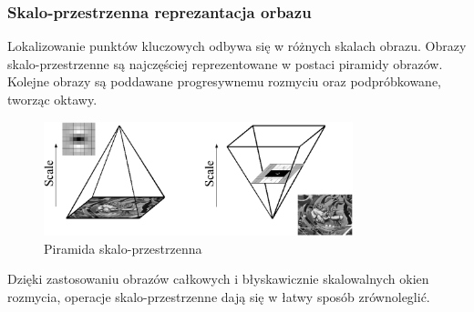 \subsubsection{Skalo-przestrzenna reprezantacja orbazu}
Lokalizowanie punktów kluczowych odbywa się w różnych skalach obrazu. Obrazy skalo-przestrzenne są najczęściej reprezentowane w postaci piramidy obrazów. Kolejne obrazy są poddawane progresywnemu rozmyciu oraz podpróbkowane, tworząc oktawy.
\begin{figure}[!htb]
\centering
\includegraphics[width=0.8\textwidth]{pict/02/surf/surf_bay_scale_piramid.png}
\caption{Piramida skalo-przestrzenna}
\label{fig:surf_bay_scale_piramid}
\end{figure}


Dzięki zastosowaniu obrazów całkowych i błyskawicznie skalowalnych okien rozmycia, operacje skalo-przestrzenne dają się w łatwy sposób zrównoleglić.



